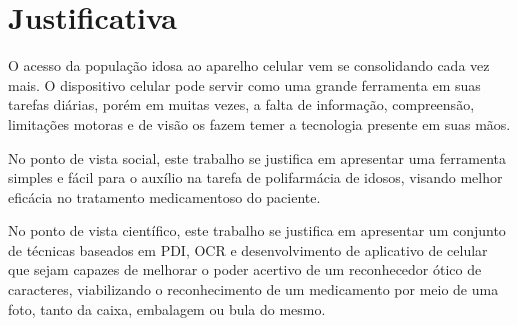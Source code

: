 \section{Justificativa}


O acesso da população idosa ao aparelho celular vem se consolidando cada vez mais. O dispositivo celular pode servir como uma grande ferramenta em suas tarefas diárias, porém em muitas vezes, a falta de informação, compreensão, limitações motoras e de visão os fazem temer a tecnologia presente em suas mãos. 

No ponto de vista social, este trabalho se justifica em apresentar uma ferramenta simples e fácil para o auxílio na tarefa de polifarmácia de idosos, visando melhor eficácia no tratamento medicamentoso do paciente.

No ponto de vista científico, este trabalho se justifica em apresentar um conjunto de técnicas baseados em PDI, OCR e desenvolvimento de aplicativo de celular que sejam capazes de melhorar o poder acertivo de um reconhecedor ótico de caracteres, viabilizando o reconhecimento de um medicamento por meio de uma foto, tanto da caixa, embalagem ou bula do mesmo.







